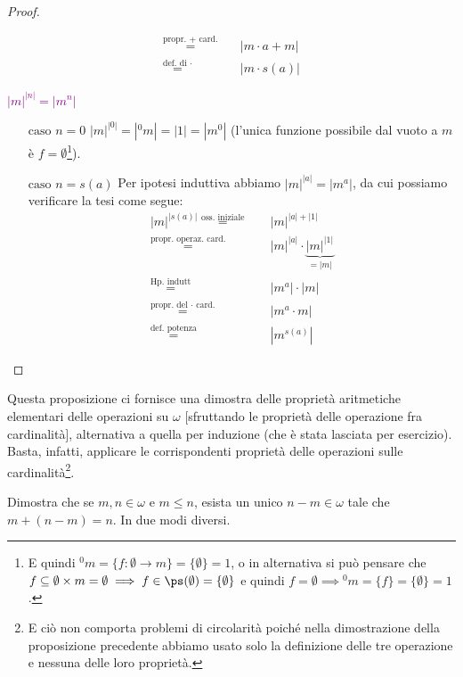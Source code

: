 \documentclass[11pt]{scrartcl}
\begin{document}
\begin{proof}
\begin{itemize}
\[\begin{split}
						 \overset{\text{propr. $+$ card.}}{=}\quad& |m \cdot a + m| \\
						 \overset{\text{def. di $\cdot$}}{=}\quad\;& |m \cdot s(a)|
 		\end{split} 
			\]
	\end{itemize}
	\textcolor{purple}{$|m|^{|n|} = |m^n|$}
	\begin{itemize}
		\item[$\boxed{\text{caso $n = 0$}}$] $|m|^{|0|} =  |{}^{0}m| = |1| = |m^0|$ (l'unica funzione possibile dal vuoto a $m$ è $f = \emptyset$\footnote{E quindi ${}^0m = \{f : \emptyset \rightarrow m\} = \{\emptyset\} = 1$, o in alternativa si può pensare che
		$f \subseteq \emptyset \times m = \emptyset \implies f \in \ps(\emptyset) = \{\emptyset\}$ e quindi $f = \emptyset \implies {}^0m = \{f\} = \{\emptyset\} = 1$.}).
		\item[$\boxed{\text{caso $n = s(a)$}}$] Per ipotesi induttiva abbiamo $|m|^|a| = |m^a|$, da cui possiamo verificare la tesi come segue:
		\[ \begin{split}
			|m|^{|s(a)|} \overset{\text{oss. iniziale}}{=}\quad& |m|^{|a| + |1|} \\
						 \overset{\text{propr. operaz. card.}}{=}& |m|^{|a|} \cdot \underbrace{|m|^{|1|}}_{=|m|} \\
						 \overset{\text{Hp. indutt}}{=}\quad& |m^a| \cdot |m| \\
						 \overset{\text{propr. del $\cdot$ card.}}{=}\quad& |m^a \cdot m| \\
						 \overset{\text{def. potenza}}{=}\quad\;& |m^{s(a)}|
 		\end{split} 
			\]
	\end{itemize}
\end{proof}

\begin{note}
	Questa proposizione ci fornisce una dimostra delle proprietà aritmetiche elementari delle operazioni su $\omega$ [sfruttando le proprietà delle operazione fra cardinalità], alternativa a quella per induzione (che è stata lasciata per esercizio).
	Basta, infatti, applicare le corrispondenti proprietà delle operazioni sulle cardinalità\footnote{E ciò non comporta problemi di circolarità poiché nella dimostrazione della proposizione precedente abbiamo usato solo la definizione delle tre operazione e nessuna delle  loro proprietà.}.
\end{note}

\begin{exercise}
	Dimostra che se $m,n \in \omega$ e $m \leq n$, esista un unico $n-m \in \omega$ tale che $m + (n-m) = n$. In due modi diversi.
\end{exercise}
\end{document}
